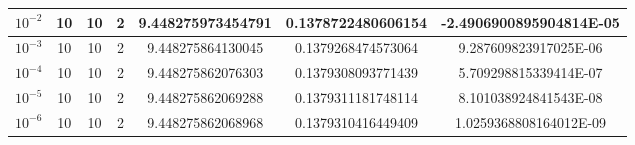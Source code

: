 \documentclass[12pt]{article}
\begin{document}
\begin{table}[H]
\begin{tabular}{|c|c|c|c|c|c|c|}
$10^{-2}$ & 10 & 10 & 2 & 9.448275973454791   & 0.1378722480606154  & -2.4906900895904814E-05 \\ \hline
$10^{-3}$ & 10 & 10 & 2 & 9.448275864130045   & 0.1379268474573064  & 9.287609823917025E-06   \\ \hline
$10^{-4}$ & 10 & 10 & 2 & 9.448275862076303   & 0.1379308093771439  & 5.709298815339414E-07   \\ \hline
$10^{-5}$ & 10 & 10 & 2 & 9.448275862069288   & 0.1379311181748114  & 8.101038924841543E-08   \\ \hline
$10^{-6}$ & 10 & 10 & 2 & 9.448275862068968   & 0.1379310416449409  & 1.0259368808164012E-09  \\ \hline
\end{tabular}
\end{table}
\end{document}
